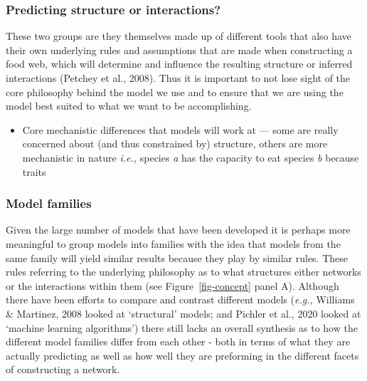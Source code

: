 \documentclass[
]{agujournal2019}
\providecommand{\tightlist}{%
  \setlength{\itemsep}{0pt}\setlength{\parskip}{0pt}}\usepackage{longtable,booktabs,array}
\begin{document}
\subsubsection{Predicting structure or
interactions?}\label{predicting-structure-or-interactions}

These two groups are they themselves made up of different tools that
also have their own underlying rules and assumptions that are made when
constructing a food web, which will determine and influence the
resulting structure or inferred interactions (Petchey et al., 2008).
Thus it is important to not lose sight of the core philosophy behind the
model we use and to ensure that we are using the model best suited to
what we want to be accomplishing.

\begin{itemize}
\tightlist
\item
  Core mechanistic differences that models will work at --- some are
  really concerned about (and thus constrained by) structure, others are
  more mechanistic in nature \emph{i.e.,} species \emph{a} has the
  capacity to eat species \emph{b} because traits
\end{itemize}

\subsubsection{Model families}\label{model-families}

Given the large number of models that have been developed it is perhaps
more meaningful to group models into families with the idea that models
from the same family will yield similar results because they play by
similar rules. These rules referring to the underlying philosophy as to
what structures either networks or the interactions within them (see
Figure~\ref{fig-concept} panel A). Although there have been efforts to
compare and contrast different models (\emph{e.g.,} Williams \&
Martinez, 2008 looked at `structural' models; and Pichler et al., 2020
looked at `machine learning algorithms') there still lacks an overall
synthesis as to how the different model families differ from each other
- both in terms of what they are actually predicting as well as how well
they are preforming in the different facets of constructing a network.
\end{document}
